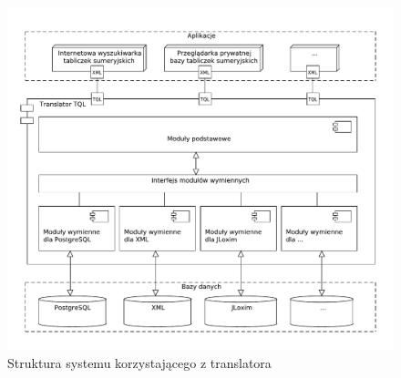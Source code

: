 \begin{figure}[h]
 \centering
 \includegraphics[width=450px,bb=0 0 608 517]{../diagramy/struktura2.pdf}
 \caption{Struktura systemu korzystającego z translatora}
\end{figure}


